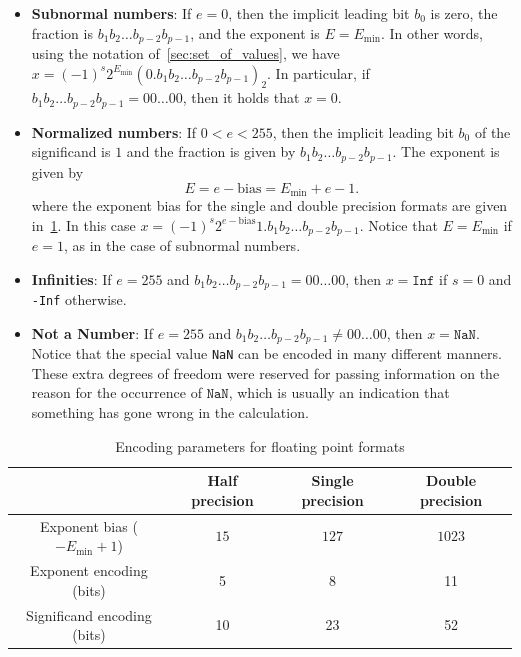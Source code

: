 \begin{itemize}
    \item
        \textbf{Subnormal numbers}:
        If $e = 0$, then the implicit leading bit $b_0$ is zero,
        the fraction is $b_1 b_2 \dots b_{p-2} b_{p-1}$, and the exponent is $E = E_{\min}$.
        In other words, using the notation of~\cref{sec:set_of_values},
        we have $x = (-1)^s 2^{E_{\min}} (0.b_1b_2 \dots b_{p-2} b_{p-1})_2$.
        In particular, if $b_1 b_2 \dots b_{p-2} b_{p-1} = 00\dots00$,
        then it holds that $x = 0$.
    \item
        \textbf{Normalized numbers}:
        If $0 < e < 255$,
        then the implicit leading bit $b_0$ of the significand is $1$
        and the fraction is given by $b_1 b_2 \dots b_{p-2} b_{p-1}$.
        The exponent is given by
        \[
            E = e - \mathrm{bias} = E_{\min} + e - 1.
        \]
        where the exponent bias for the single and double precision formats are given in~\cref{table:floating_point_formats_encoding}.
        In this case $x = (-1)^s 2^{e - \mathrm{bias}} 1.b_1b_2 \dots b_{p-2} b_{p-1}$.
        Notice that $E = E_{\min}$ if $e = 1$,
        as in the case of subnormal numbers.
    \item
        \textbf{Infinities}:
        If $e = 255$ and $b_1 b_2 \dots b_{p-2} b_{p-1} = 00\dots00$,
        then $x = \texttt{Inf}$ if $s = 0$ and \texttt{-Inf} otherwise.
    \item
        \textbf{Not a Number}:
        If $e = 255$ and  $b_1 b_2 \dots b_{p-2} b_{p-1} \neq 00\dots00$,
        then $x = \texttt{NaN}$.
        Notice that the special value \texttt{NaN} can be encoded in many different manners.
        These extra degrees of freedom were reserved for passing information on the reason for the occurrence of $\texttt{NaN}$,
        which is usually an indication that something has gone wrong in the calculation.
\end{itemize}

\begin{table}[ht]
    \centering
    \begin{tabular}{|c|c|c|c|}
        \hline
        & Half precision & Single precision & Double precision
        \\ \hline
        Exponent bias ($-E_{\min} + 1$) & $15$ & $127$ & $1023$
        \\ \hline
        Exponent encoding (bits) & 5 & 8 & 11
        \\ \hline
        Significand encoding (bits) & 10 & 23 & 52
        \\ \hline
    \end{tabular}
    \caption{Encoding parameters for floating point formats}%
    \label{table:floating_point_formats_encoding}
\end{table}

